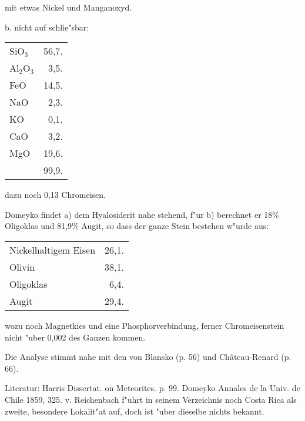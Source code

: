 \documentclass[a4paper, 11pt, oneside]{article}
\begin{document}
mit etwas Nickel und Manganoxyd.

\begin{center}
b. nicht auf schlie"sbar: 
\end{center}

\begin{table}[H]
    \centering\swabfamily\Large
    \begin{tabular}{l r}
        SiO$_{3}$ & 56,7. \\
        Al$_{2}$O$_{3}$ & 3,5. \\
        FeO & 14,5. \\
        NaO & 2,3. \\
        KO & 0,1. \\
        CaO & 3,2. \\
        MgO & 19,6. \\
         & 99,9. \\
    \end{tabular}
\end{table}

dazu noch 0,13 Chromeisen.

Domeyko findet a) dem Hyalosiderit nahe stehend, f"ur b) berechnet er 18\% Oligoklas und 81,9\% Augit, so dass der ganze Stein bestehen w"urde aus:

\begin{table}[H]
    \centering\swabfamily\Large
    \begin{tabular}{l r}
        Nickelhaltigem Eisen & 26,1. \\
        Olivin & 38,1. \\
        Oligoklas & 6,4. \\
        Augit & 29,4. \\
    \end{tabular}
\end{table}

wozu noch Magnetkies und eine Phosphorverbindung, ferner Chromeisenstein nicht "uber 0,002 des Ganzen kommen.

Die Analyse stimmt nahe mit den von Blansko (p. 56) und Château-Renard (p. 66).

\normalsize
Literatur: Harris Dissertat. on Meteorites. p. 99. Domeyko Annales de la Univ. de Chile 1859, 325. v. Reichenbach f"uhrt in seinem Verzeichnis noch Costa Rica als zweite, besondere Lokalit"at auf, doch ist "uber dieselbe nichts bekannt.

\subsection{}
\LARGE
\end{document}
